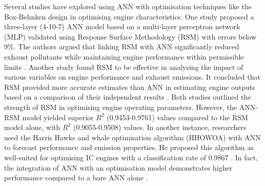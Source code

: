 \documentclass[a4paper, 12pt]{article}
\begin{document}
Several studies have explored using ANN with optimisation techniques like the Box-Behnken design in optimising engine characteristics. One study proposed a three-layer (4-10-7) ANN model based on a multi-layer perceptron network (MLP) validated using Response Surface Methodology (RSM) with errors below 9\%. The authors argued that linking RSM with ANN significantly reduced exhaust pollutants while maintaining engine performance within permissible limits \parencite{sharmaapplicationmachinelearning2023}. Another study found RSM to be effective in analysing the impact of various variables on engine performance and exhaust emissions. It concluded that RSM provided more accurate estimates than ANN in estimating engine outputs based on a comparison of their independent results \parencite{usluOptimizationDieselEngine2020}. Both studies outlined the strength of RSM in optimising engine operating parameters. However, the ANN-RSM model yielded superior $R^2$ (0.9453-0.9761) values compared to the RSM model alone, with $R^2$ (0.9055-0.9508) values. In another instance, researchers used the Harris Hawks and whale optimisation algorithm (HHOWOA) with ANN to forecast performance and emission properties. He proposed this algorithm as well-suited for optimising IC engines with a classification rate of 0.9867 \parencite{singhSampleddataModelValidation2020}. In fact, the integration of ANN with an optimisation model demonstrates higher performance compared to a bare ANN alone \parencite{gunawanApplicationArtificialNeural2024}. \\


\end{document}

